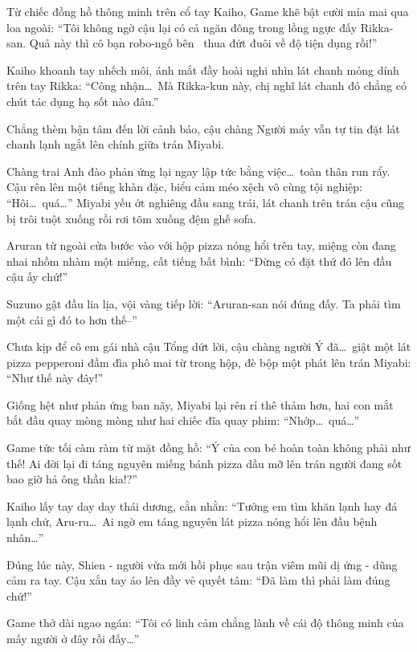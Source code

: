 \documentclass[../main.tex]{subfiles}
\begin{document}

Từ chiếc đồng hồ thông minh trên cổ tay Kaiho, Game khẽ bật cười mỉa mai qua loa ngoài: ``Tôi không ngờ cậu lại có cả ngăn đông trong lồng ngực đấy Rikka-san. Quả này thì cô bạn robo-ngố bên \hll\ thua đứt đuôi về độ tiện dụng rồi!''

Kaiho khoanh tay nhếch môi, ánh mắt đầy hoài nghi nhìn lát chanh mỏng dính trên tay Rikka: ``Công nhận\dots\ Mà Rikka-kun này, chị nghĩ lát chanh đó chẳng có chút tác dụng hạ sốt nào đâu.''

Chẳng thèm bận tâm đến lời cảnh báo, cậu chàng Người máy vẫn tự tin đặt lát chanh lạnh ngắt lên chính giữa trán Miyabi.

Chàng trai Anh đào phản ứng lại ngay lập tức bằng việc\dots\ toàn thân run rẩy. Cậu rên lên một tiếng khàn đặc, biểu cảm méo xệch vô cùng tội nghiệp: ``Hôi\dots\ quá\dots'' Miyabi yếu ớt nghiêng đầu sang trái, lát chanh trên trán cậu cũng bị trôi tuột xuống rồi rơi tõm xuống đệm ghế sofa.


Aruran từ ngoài cửa bước vào với hộp pizza nóng hổi trên tay, miệng còn đang nhai nhồm nhàm một miếng, cất tiếng bất bình: ``Đừng có đặt thứ đó lên đầu cậu ấy chứ!''

Suzuno gật đầu lia lịa, vội vàng tiếp lời: ``Aruran-san nói đúng đấy. Ta phải tìm một cái gì đó to hơn thế--''

Chưa kịp để cô em gái nhà cậu Tổng dứt lời, cậu chàng người Ý đã\dots\ giật một lát pizza pepperoni đầm đìa phô mai từ trong hộp, đè bộp một phát lên trán Miyabi: ``Như thế này đây!''

Giống hệt như phản ứng ban nãy, Miyabi lại rên rỉ thê thảm hơn, hai con mắt bắt đầu quay mòng mòng như hai chiếc đĩa quay phim: ``Nhớp\dots\ quá\dots''


Game tức tối càm ràm từ mặt đồng hồ: ``Ý của con bé hoàn toàn không phải như thế! Ai đời lại đi táng nguyên miếng bánh pizza dầu mỡ lên trán người đang sốt bao giờ hả ông thần kia!?''

Kaiho lấy tay day day thái dương, cằn nhằn: ``Tưởng em tìm khăn lạnh hay đá lạnh chứ, Aru-ru\dots\ Ai ngờ em táng nguyên lát pizza nóng hổi lên đầu bệnh nhân\dots''

Đúng lúc này, Shien - người vừa mới hồi phục sau trận viêm mũi dị ứng - dũng cảm ra tay. Cậu xắn tay áo lên đầy vẻ quyết tâm: ``Đã làm thì phải làm đúng chứ!''

Game thở dài ngao ngán: ``Tôi có linh cảm chẳng lành về cái độ thông minh của mấy người ở đây rồi đấy\dots''
\end{document}
